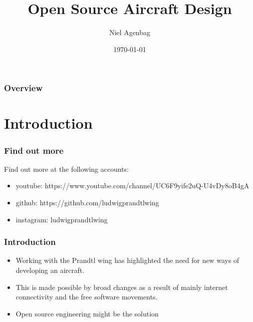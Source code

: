 \documentclass{beamer}
\title[Open Aircraft Design]{Open Source Aircraft Design} %
\author{Niel Agenbag} %
\institute[Unaffiliated] %
{
Unaffiliated \\ %
\medskip
\textit{Ludwigprandtlwing@gmail.com} %
}
\date{\today} %
\begin{document}
\begin{frame}
\titlepage %
\end{frame}

\begin{frame}
\frametitle{Overview} %
\tableofcontents %
\end{frame}


\section{Introduction}


\begin{frame}
\frametitle{Find out more}

Find out more at the following accounts:

\begin{itemize}
\item youtube:  https://www.youtube.com/channel/UC6F9yife2uQ-U4vDy8oB4gA
\item github:  https://github.com/ludwigprandtlwing
\item instagram:  ludwigprandtlwing
\end{itemize}
\end{frame}


\begin{frame}
\frametitle{Introduction}

\begin{itemize}
\item Working with the Prandtl wing has highlighted the need for new ways of developing an aircraft.
\item This is made possible by broad changes as a result of mainly internet connectivity and the free software movements.
\item Open source engineering might be the solution
\end{itemize}

\end{frame}
\end{document}
